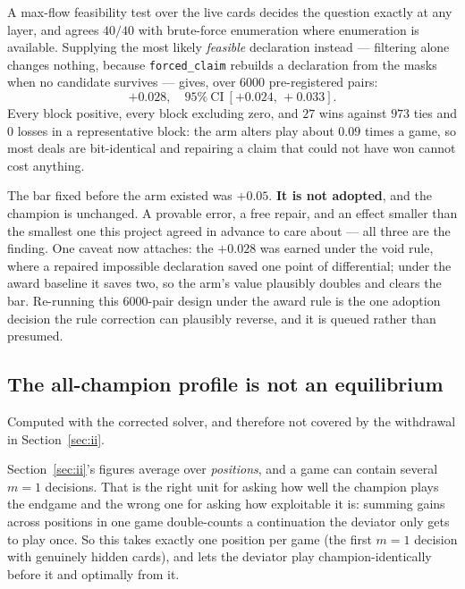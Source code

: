 \documentclass[11pt,letterpaper]{article}
\begin{document}
A max-flow feasibility test over the live cards decides the question exactly at
any layer, and agrees $40/40$ with brute-force enumeration where enumeration is
available. Supplying the most likely \emph{feasible} declaration instead ---
filtering alone changes nothing, because \texttt{forced\_claim} rebuilds a
declaration from the masks when no candidate survives --- gives, over $6000$
pre-registered pairs:
\[
+0.028,\quad 95\%\ \text{CI}\ [+0.024,\, +0.033].
\]
Every block positive, every block excluding zero, and $27$ wins against $973$
ties and $0$ losses in a representative block: the arm alters play about $0.09$
times a game, so most deals are bit-identical and repairing a claim that could
not have won cannot cost anything.

The bar fixed before the arm existed was $+0.05$. \textbf{It is not adopted},
and the champion is unchanged. A provable error, a free repair, and an effect
smaller than the smallest one this project agreed in advance to care about ---
all three are the finding. One caveat now attaches: the $+0.028$ was earned
under the void rule, where a repaired impossible declaration saved one point
of differential; under the award baseline it saves two, so the arm's value
plausibly doubles and clears the bar. Re-running this 6000-pair design under
the award rule is the one adoption decision the rule correction can
plausibly reverse, and it is queued rather than presumed.

\subsection{The all-champion profile is not an equilibrium}
\label{sec:noneq}

Computed with the corrected solver, and therefore not covered by the
withdrawal in Section~\ref{sec:ii}.

Section~\ref{sec:ii}'s figures average over \emph{positions}, and a game can
contain several $m = 1$ decisions. That is the right unit for asking how well
the champion plays the endgame and the wrong one for asking how exploitable it
is: summing gains across positions in one game double-counts a continuation the
deviator only gets to play once. So this takes exactly one position per game
(the first $m = 1$ decision with genuinely hidden cards), and lets the deviator
play champion-identically before it and optimally from it.
\end{document}

